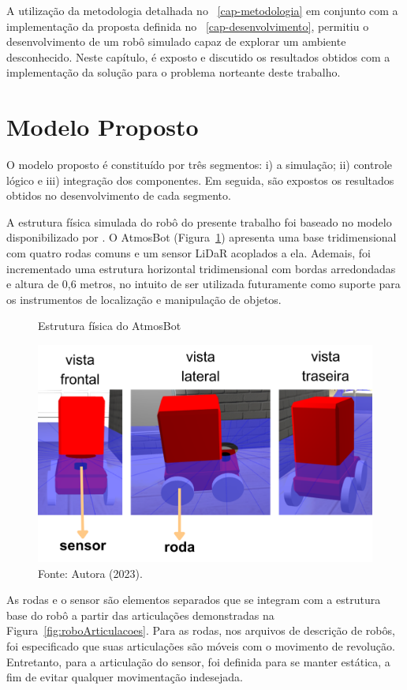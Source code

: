 A utilização da metodologia detalhada no \chapterautorefname~\ref{cap-metodologia} em conjunto com a implementação da proposta definida no \chapterautorefname~\ref{cap-desenvolvimento},  permitiu o desenvolvimento de um robô simulado capaz de explorar um ambiente desconhecido. Neste capítulo, é exposto e discutido os resultados obtidos com a implementação da solução para o problema norteante deste trabalho. 

\section{Modelo Proposto}
O modelo proposto é constituído por três segmentos: i) a simulação; ii) controle lógico e iii) integração dos componentes. Em seguida, são expostos os resultados obtidos no desenvolvimento de cada segmento.

A estrutura física simulada do robô do presente trabalho foi baseado no modelo disponibilizado por \citet{modeloRobo}. O AtmosBot (Figura~\ref{fig:fotoRobo}) apresenta uma base  tridimensional com quatro rodas comuns e um sensor LiDaR acoplados a ela. Ademais, foi incrementado uma estrutura horizontal  tridimensional com bordas arredondadas e altura de 0,6 metros, no intuito de ser utilizada futuramente como suporte para os instrumentos de localização e manipulação de objetos.

\begin{figure}[h]
    \centering
    \caption{Estrutura física do AtmosBot}
    \includegraphics[scale=0.5]{robo.png}
    \caption*{Fonte: Autora (2023).}
    \label{fig:fotoRobo}
\end{figure}

As rodas e o sensor são elementos separados que se integram com a estrutura base do robô a partir das articulações demonstradas na Figura~\ref{fig:roboArticulacoes}. Para as rodas, nos arquivos de descrição de robôs, foi especificado que suas articulações são móveis com o movimento de revolução. Entretanto, para a articulação do sensor, foi definida para se manter estática, a fim de evitar qualquer movimentação indesejada.

